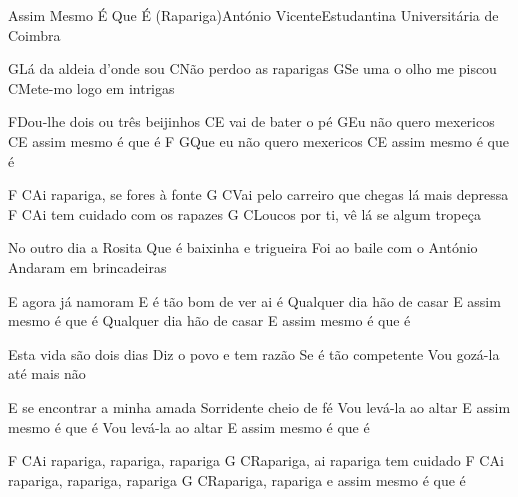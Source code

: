 \begin{musica}{Assim Mesmo É Que É (Rapariga)}{António Vicente}{Estudantina Universitária de Coimbra}

\ac{G}{}Lá da aldeia d'onde sou
\ac{C}{}Não perdoo as raparigas
\ac{G}{}Se uma o olho me piscou
\ac{C}{}Mete-mo logo em intrigas

\ac{F}{}Dou-lhe dois ou três beijinhos
\ac{C}{}E vai de bater o pé
\ac{G}{}Eu não quero mexericos
\ac{C}{}E assim mesmo é que é
\ac{F G}{}Que eu não quero mexericos
\ac{C}{}E assim mesmo é que é

\ac{F C}{}Ai rapariga, se fores à fonte
\ac{G C}{}Vai pelo carreiro que chegas lá mais depressa
\ac{F C}{}Ai tem cuidado com os rapazes
\ac{G C}{}Loucos por ti, vê lá se algum tropeça


No outro dia a Rosita
Que é baixinha e trigueira
Foi ao baile com o António
Andaram em brincadeiras

E agora já namoram
E é tão bom de ver ai é
Qualquer dia hão de casar
E assim mesmo é que é
Qualquer dia hão de casar
E assim mesmo é que é



Esta vida são dois dias
Diz o povo e tem razão
Se é tão competente
Vou gozá-la até mais não

E se encontrar a minha amada
Sorridente cheio de fé
Vou levá-la ao altar
E assim mesmo é que é
Vou levá-la ao altar
E assim mesmo é que é



\ac{F C}{}Ai rapariga, rapariga, rapariga
\ac{G C}{}Rapariga, ai rapariga tem cuidado
\ac{F C}{}Ai rapariga, rapariga, rapariga
\ac{G C}{}Rapariga, rapariga e assim mesmo é que é


\end{musica}

